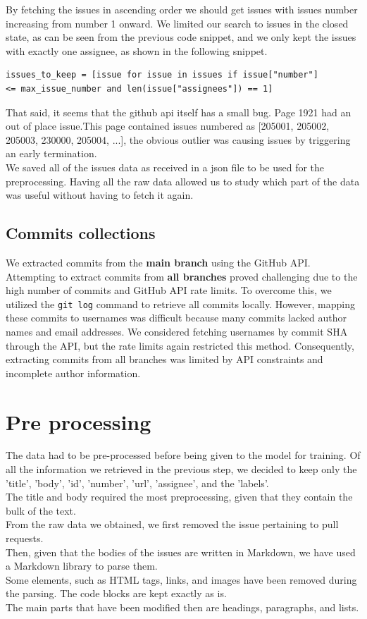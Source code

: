 \documentclass[tikz,10pt,fleqn]{article}
\begin{document}
By fetching the issues in ascending order we should get issues with issues number increasing from number 1 onward. We limited our search to issues in the closed state, as can be seen from the previous code snippet, and we only kept the issues with exactly one assignee, as shown in the following snippet.\\
\begin{verbatim}
issues_to_keep = [issue for issue in issues if issue["number"]
<= max_issue_number and len(issue["assignees"]) == 1]
\end{verbatim}

That said, it seems that the github api itself has a small bug. Page 1921 had an out of place issue.\newpage This page contained issues numbered as [205001, 205002, 205003, 230000, 205004, ...], the obvious outlier was causing issues by triggering an early termination.\\
We saved all of the issues data as received in a json file to be used for the preprocessing. Having all the raw data allowed us to study which part of the data was useful without having to fetch it again.\\

\subsection*{Commits collections}
We extracted commits from the \textbf{main branch} using the GitHub API. Attempting to extract commits from \textbf{all branches} proved challenging due to the high number of commits and GitHub API rate limits. To overcome this, we utilized the \texttt{git log} command to retrieve all commits locally. However, mapping these commits to usernames was difficult because many commits lacked author names and email addresses. We considered fetching usernames by commit SHA through the API, but the rate limits again restricted this method. Consequently, extracting commits from all branches was limited by API constraints and incomplete author information.



\section*{Pre processing}

The data had to be pre-processed before being given to the model for training.
Of all the information we retrieved in the previous step, we decided to keep only the 'title', 'body', 'id', 'number', 'url', 'assignee', and the 'labels'.\\
The title and body required the most preprocessing, given that they contain the bulk of the text.  \\
From the raw data we obtained, we first removed the issue pertaining to pull requests.\\
Then, given that the bodies of the issues are written in Markdown, we have used a Markdown library to parse them.\\
Some elements, such as HTML tags, links, and images have been removed during the parsing. The code blocks are kept exactly as is.\\
The main parts that have been modified then are headings, paragraphs, and lists.
\end{document}
